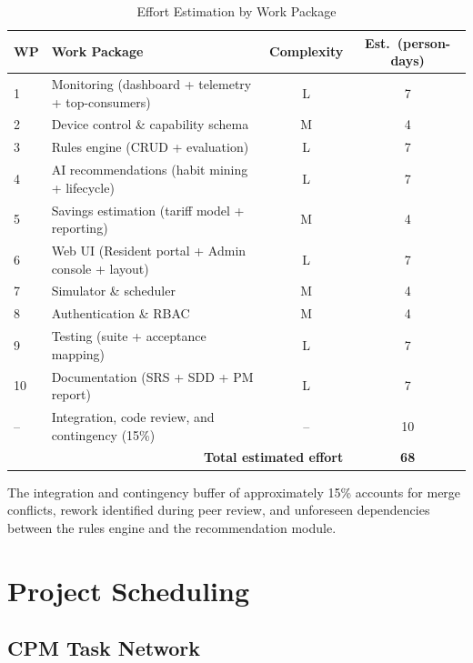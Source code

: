 \begin{table}[htbp]
  \caption{Effort Estimation by Work Package}
  \label{tab:estimation}
  \centering
  \begin{tabularx}{\linewidth}{l X c c}
    \toprule
    \textbf{WP} & \textbf{Work Package} & \textbf{Complexity} & \textbf{Est.\ (person-days)} \\
    \midrule
    1   & Monitoring (dashboard + telemetry + top-consumers) & L & 7 \\
    2   & Device control \& capability schema               & M & 4 \\
    3   & Rules engine (CRUD + evaluation)                  & L & 7 \\
    4   & AI recommendations (habit mining + lifecycle)     & L & 7 \\
    5   & Savings estimation (tariff model + reporting)     & M & 4 \\
    6   & Web UI (Resident portal + Admin console + layout) & L & 7 \\
    7   & Simulator \& scheduler                            & M & 4 \\
    8   & Authentication \& RBAC                            & M & 4 \\
    9   & Testing (suite + acceptance mapping)              & L & 7 \\
    10  & Documentation (SRS + SDD + PM report)             & L & 7 \\
    \addlinespace
    --  & Integration, code review, and contingency (15\%) & -- & 10 \\
    \midrule
    \multicolumn{3}{r}{\textbf{Total estimated effort}} & \textbf{68} \\
    \bottomrule
  \end{tabularx}
\end{table}

\noindent
The integration and contingency buffer of approximately 15\% accounts for merge
conflicts, rework identified during peer review, and unforeseen dependencies
between the rules engine and the recommendation module.

\section{Project Scheduling}

\subsection{CPM Task Network}

